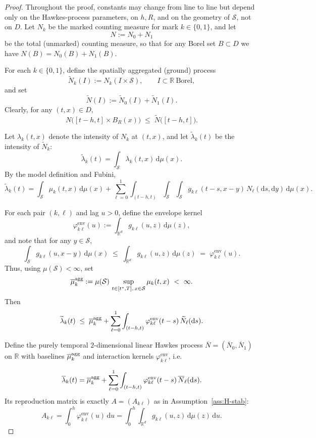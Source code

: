 \documentclass{statsoc}
\newcommand{\dd}{\mathrm{d}}
\newcommand{\bbR}{\mathbb{R}}
\newcommand{\1}{\mathbbm{1}}
\begin{document}
\begin{proof}
Throughout the proof, constants may change from line to line but depend only on the Hawkes-process parameters, on $h,R$, and on the geometry of $\mathcal S$, not on $D$. Let $N_k$ be the marked counting measure for mark $k\in\{0,1\}$, and let
\[
  N := N_0 + N_1
\]
be the total (unmarked) counting measure, so that for any Borel set $B\subset D$ we have $N(B)=N_0(B)+N_1(B)$.

For each $k\in\{0,1\}$, define the spatially aggregated (ground) process
\[
  \widetilde N_k(I)
  := N_k(I\times\mathcal{S}), \qquad I\subset\bbR\ \text{Borel},
\]
and set
\[
  \widetilde N(I) := \widetilde N_0(I)+\widetilde N_1(I).
\]
Clearly, for any $(t,x)\in D$,
\begin{equation}\label{eq:spatial-majorisation-app}
  N\bigl([t-h,t]\times B_R(x)\bigr)
  \;\le\; \widetilde N\bigl([t-h,t]\bigr).
\end{equation}

Let $\lambda_k(t,x)$ denote the intensity of $N_k$ at $(t,x)$, and let $\widetilde\lambda_k(t)$ be the intensity of $\widetilde N_k$:
\[
  \widetilde\lambda_k(t)
    = \int_{\mathcal{S}} \lambda_k(t,x)\,\dd\mu(x).
\]
By the model definition and Fubini,
\[
  \widetilde\lambda_k(t)
  = \int_{\mathcal{S}} \mu_k(t,x)\,\dd\mu(x)
    + \sum_{\ell=0}^1 \int_{(t-h,t)}\!\!\int_{\mathcal{S}}\!\int_{\mathcal{S}}
          g_{k\ell}(t-s,x-y)\,N_\ell(\dd s,\dd y)\,\dd\mu(x).
\]

For each pair $(k,\ell)$ and lag $u>0$, define the envelope kernel
\[
  \varphi^{\mathrm{env}}_{k\ell}(u)
  := \int_{\bbR^d} g_{k\ell}(u,z)\,\dd\mu(z),
\]
and note that for any $y\in\mathcal{S}$,
\[
  \int_{\mathcal{S}} g_{k\ell}(u,x-y)\,\dd\mu(x)
  \;\le\; \int_{\bbR^d} g_{k\ell}(u,z)\,\dd\mu(z)
  \;=\; \varphi^{\mathrm{env}}_{k\ell}(u).
\]
Thus, using \(\mu(\mathcal{S})<\infty\), set
\[
  \overline\mu_k^{\rm agg}
  := \mu(\mathcal{S})\,\sup_{t\in[t^\ast,T],\,x\in\mathcal{S}} \mu_k(t,x)
  \ <\ \infty.
\]
Then
\[
  \widetilde\lambda_k(t)
  \;\le\; \overline\mu_k^{\rm agg}
         + \sum_{\ell=0}^1 \int_{(t-h,t)}
                 \varphi^{\mathrm{env}}_{k\ell}(t-s)\,
                 \widetilde N_\ell(\dd s).
\]


Define the purely temporal \(2\)-dimensional linear Hawkes process \(\overline N=(\overline N_0,\overline N_1)\) on \(\bbR\) with baselines \(\overline\mu_k^{\rm agg}\) and interaction kernels \(\varphi^{\mathrm{env}}_{k\ell}\), i.e.

\[
  \overline\lambda_k(t)
  = \overline\mu_k^{\rm agg}
    + \sum_{\ell=0}^1 \int_{(t-h,t)}
           \varphi^{\mathrm{env}}_{k\ell}(t-s)\,\overline N_\ell(\dd s).
\]
Its reproduction matrix is exactly $A=(A_{k\ell})$ as in Assumption~\ref{ass:H-stab}:
\[
  A_{k\ell}
  = \int_0^h \varphi^{\mathrm{env}}_{k\ell}(u)\,\dd u
  = \int_0^h\int_{\bbR^d} g_{k\ell}(u,z)\,\dd\mu(z)\,\dd u.
\]


\end{proof}
\end{document}
